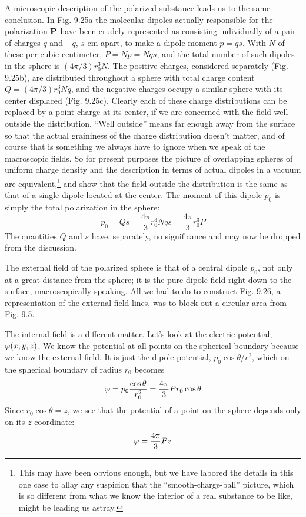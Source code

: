 A microscopic description of the polarized substance leads us to
the same conclusion. In Fig. 9.25a the molecular dipoles actually
responsible for the polarization $\mathbf{P}$ have been crudely represented as
consisting individually of a pair of charges $q$ and  $-q$, $s$ cm apart, to
make a dipole moment $p = qs$. With $N$ of these per cubic 
centimeter, $P = Np = Nqs$, and the total number of such dipoles in the
sphere is $(4\pi/3)r_0^3N$. The positive charges, considered separately
(Fig. 9.25b), are distributed throughout a sphere with total charge
content $Q=(4\pi/3)r_0^3Nq$, and the negative charges occupy a similar
sphere with its center displaced (Fig. 9.25c). Clearly each of these
charge distributions can be replaced by a point charge at its center,
if we are concerned with the field well outside the distribution. ``Well
outside'' means far enough away from the surface so that the actual
graininess of the charge distribution doesn't matter, and of course
that is something we always have to ignore when we speak of the
macroscopic fields. So for present purposes the picture of overlapping
spheres of uniform charge density and the description in
terms of actual dipoles in a vacuum are 
equivalent,\footnote{This may have been obvious enough, but
we have labored the details in this one
case to allay any suspicion that the ``smooth-charge-ball'' picture, which is so different
from what we know the interior of a real substance to be like, might be leading us
astray.} and show that
the field outside the distribution is the same as that of a single dipole
located at the center. The moment of this dipole $p_0$ is simply the
total polarization in the sphere:
\begin{equation}
  p_0 = Qs = \frac{4\pi}{3} r_0^3Nqs = \frac{4\pi}{3} r_0^3P
\end{equation}
The quantities $Q$ and $s$ have, separately, no significance and may
now be dropped from the discussion.

The external field of the polarized sphere is that of a central
dipole $p_0$, not only at a great distance from the sphere; it is the pure
dipole field right down to the surface, macroscopically speaking.
All we had to do to construct Fig. 9.26, a representation of the external
field lines, was to block out a circular area from Fig. 9.5.

The internal field is a different matter. Let's look at the electric
potential, $\varphi(x,y,z)$. We know the potential at all points on the
spherical boundary because we know the external field. It is just
the dipole potential, $p_0 \cos \theta/r^2$, which on the spherical boundary of
radius $r_0$ becomes
\begin{equation}
  \varphi = p_0\frac{\cos\theta}{r_0^2} = \frac{4\pi}{3}Pr_0\cos\theta
\end{equation}
Since $r_0\cos\theta=z$, we see that the potential of a point on the sphere
depends only on its $z$ coordinate:
\begin{equation}
  \varphi = \frac{4\pi}{3}Pz
\end{equation}

